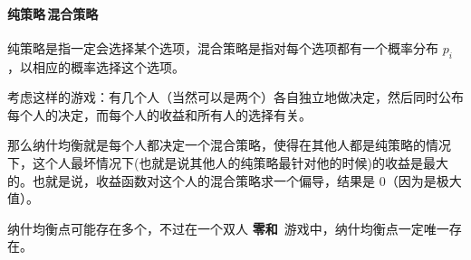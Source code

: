\paragraph{纯策略\,混合策略} 纯策略是指一定会选择某个选项，混合策略是指对每个选项都有一个概率分布 $p_i$，以相应的概率选择这个选项。

考虑这样的游戏：有几个人（当然可以是两个）各自独立地做决定，然后同时公布每个人的决定，而每个人的收益和所有人的选择有关。

那么纳什均衡就是每个人都决定一个混合策略，使得在其他人都是纯策略的情况下，这个人最坏情况下(也就是说其他人的纯策略最针对他的时候)的收益是最大的。也就是说，收益函数对这个人的混合策略求一个偏导，结果是 0（因为是极大值）。

纳什均衡点可能存在多个，不过在一个双人 \textbf{零和}\ 游戏中，纳什均衡点一定唯一存在。
